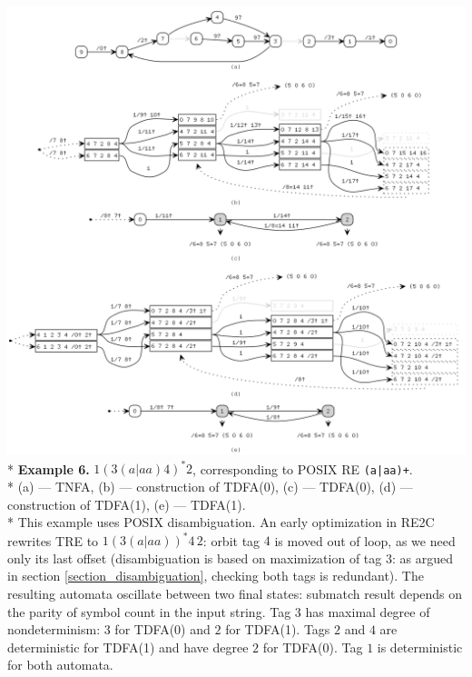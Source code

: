 \documentclass{article}
\newenvironment{Xfig}
    {\par\medskip\noindent\minipage{\linewidth}\begin{center}}
    {\end{center}\endminipage\par\medskip}
\theoremstyle{definition}
\begin{document}
\begin{Xfig}
\includegraphics[width=\linewidth]{img/example4/all.png}\\*
\textbf{Example 6.} $1 (3 (a | aa) 4)^* 2$, corresponding to POSIX RE \texttt{(a|aa)+}.\\*
(a) --- TNFA, (b) --- construction of TDFA(0), (c) --- TDFA(0), (d) --- construction of TDFA(1), (e) --- TDFA(1).\\*
This example uses POSIX disambiguation.
An early optimization in RE2C rewrites TRE to $1 (3 (a | aa) )^* 4 \, 2$:
orbit tag $4$ is moved out of loop, as we need only its last offset
(disambiguation is based on maximization of tag $3$: as argued in section \ref{section_disambiguation}, checking both tags is redundant).
The resulting automata oscillate between two final states:
submatch result depends on the parity of symbol count in the input string.
Tag $3$ has maximal degree of nondeterminism: $3$ for TDFA(0) and $2$ for TDFA(1).
Tags $2$ and $4$ are deterministic for TDFA(1) and have degree $2$ for TDFA(0).
Tag $1$ is deterministic for both automata.
\end{Xfig}
\end{document}
